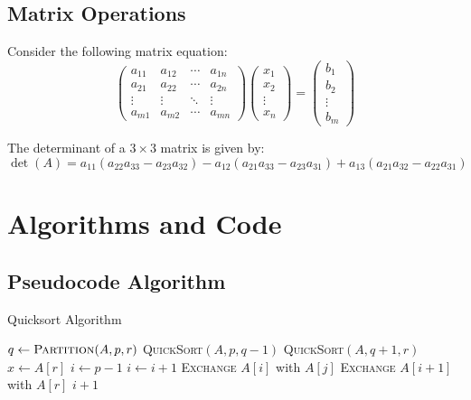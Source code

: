\documentclass[12pt,a4paper,twoside]{article}
\theoremstyle{definition}
\begin{document}
\subsection{Matrix Operations}

Consider the following matrix equation:
\begin{equation}
\begin{pmatrix}
a_{11} & a_{12} & \cdots & a_{1n} \\
a_{21} & a_{22} & \cdots & a_{2n} \\
\vdots & \vdots & \ddots & \vdots \\
a_{m1} & a_{m2} & \cdots & a_{mn}
\end{pmatrix}
\begin{pmatrix}
x_1 \\ x_2 \\ \vdots \\ x_n
\end{pmatrix}
=
\begin{pmatrix}
b_1 \\ b_2 \\ \vdots \\ b_m
\end{pmatrix}
\end{equation}

The determinant of a $3 \times 3$ matrix is given by:
\begin{equation}
\det(A) = a_{11}(a_{22}a_{33} - a_{23}a_{32}) - a_{12}(a_{21}a_{33} - a_{23}a_{31}) + a_{13}(a_{21}a_{32} - a_{22}a_{31})
\end{equation}

\section{Algorithms and Code}

\subsection{Pseudocode Algorithm}

\begin{algorithm}[H]
\caption{Quicksort Algorithm}
\label{alg:quicksort}
\begin{algorithmic}[1]
        \State $q \gets \textsc{Partition}(A, p, r)$
        \State \textsc{QuickSort}$(A, p, q-1)$
        \State \textsc{QuickSort}$(A, q+1, r)$
    \EndIf
\EndProcedure
\State
{}
    \State $x \gets A[r]$
    \State $i \gets p - 1$
            \State $i \gets i + 1$
            \State \textsc{Exchange} $A[i]$ with $A[j]$
        \EndIf
    \EndFor
    \State \textsc{Exchange} $A[i+1]$ with $A[r]$
    \State \Return $i + 1$
\EndProcedure
\end{algorithmic}
\end{algorithm}
\end{document}
